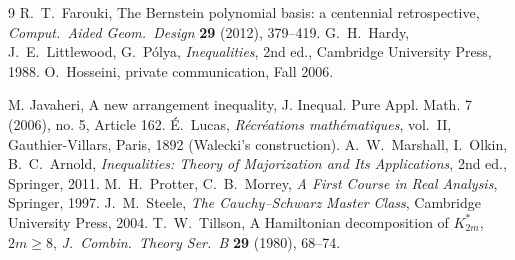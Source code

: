 \documentclass[11pt]{article}
\theoremstyle{remark}
\numberwithin{equation}{section}
\begin{document}
\begin{thebibliography}{9}
 R.~T.~Farouki, The Bernstein polynomial basis: a centennial retrospective,
\emph{Comput.\ Aided Geom.\ Design} \textbf{29} (2012), 379--419.
 G.~H.~Hardy, J.~E.~Littlewood, G.~P\'olya, \emph{Inequalities}, 2nd ed.,
Cambridge University Press, 1988.
 O.~Hosseini, private communication, Fall 2006.

 M. Javaheri, A new arrangement inequality, J. Inequal. Pure Appl. Math. 7 (2006), no. 5, Article 162.
 \'E.~Lucas, \emph{R\'ecr\'eations math\'ematiques}, vol.~II, Gauthier-Villars,
Paris, 1892 (Walecki's construction).
 A.~W.~Marshall, I.~Olkin, B.~C.~Arnold, \emph{Inequalities: Theory of Majorization
and Its Applications}, 2nd ed., Springer, 2011.
 M.~H.~Protter, C.~B.~Morrey, \emph{A First Course in Real Analysis}, Springer, 1997.
 J.~M.~Steele, \emph{The Cauchy--Schwarz Master Class}, Cambridge University Press,
2004.
 T.~W.~Tillson, A Hamiltonian decomposition of $K^*_{2m}$, $2m\ge8$,
\emph{J.\ Combin.\ Theory Ser.\ B} \textbf{29} (1980), 68--74.
\end{thebibliography}
\end{document}
